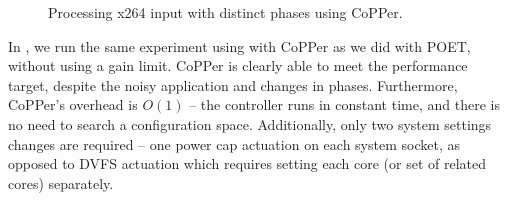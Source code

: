 \begin{figure}[t]
  
  \caption{Processing x264 input with distinct phases using CoPPer.}
  \label{fig:poet-phases-x264}
\end{figure}

In , we run the same experiment using  with CoPPer as we did with POET, without using a gain limit.
CoPPer is clearly able to meet the performance target, despite the noisy application and changes in phases.
Furthermore, CoPPer's overhead is $O(1)$ -- the controller runs in constant time, and there is no need to search a configuration space.
Additionally, only two system settings changes are required -- one power cap actuation on each system socket, as opposed to DVFS actuation which requires setting each core (or set of related cores) separately.
